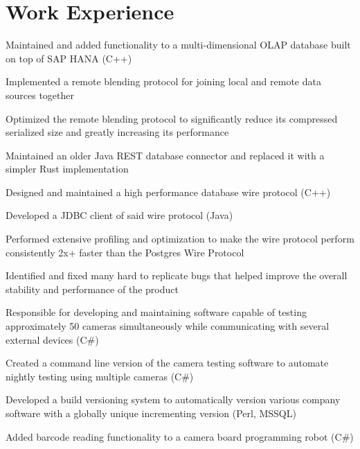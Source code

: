 \documentclass[]{deedy-resume-openfont}
\begin{document}
    
%
%
%
%
\section{Work Experience}
\hfill {}
\begin{tightemize}
	\item Maintained and added functionality to a multi-dimensional OLAP database built on top of SAP HANA (C++)
	\item Implemented a remote blending protocol for joining local and remote data sources together
	\item Optimized the remote blending protocol to significantly reduce its compressed serialized size and greatly increasing its performance
	\item Maintained an older Java REST database connector and replaced it with a simpler Rust implementation
\end{tightemize}
\sectionsep
{}\hfill {}
\begin{tightemize}
	\item Designed and maintained a high performance database wire protocol (C++)
	\item Developed a JDBC client of said wire protocol (Java)
	\item Performed extensive profiling and optimization to make the wire protocol perform consistently 2x+ faster than the Postgres Wire Protocol
	\item Identified and fixed many hard to replicate bugs that helped improve the overall stability and performance of the product
\end{tightemize}
\sectionsep
{}\hfill {}
\begin{tightemize}
	\item Responsible for developing and maintaining software capable of testing approximately 50 cameras simultaneously while communicating with several external devices (C\#)
	\item Created a command line version of the camera testing software to automate nightly testing using multiple cameras (C\#)
	\item Developed a build versioning system to automatically version various company software with a globally unique incrementing version (Perl, MSSQL)
	\item Added barcode reading functionality to a camera board programming robot (C\#)
\end{tightemize}
\sectionsep
%
%
\end{document}
